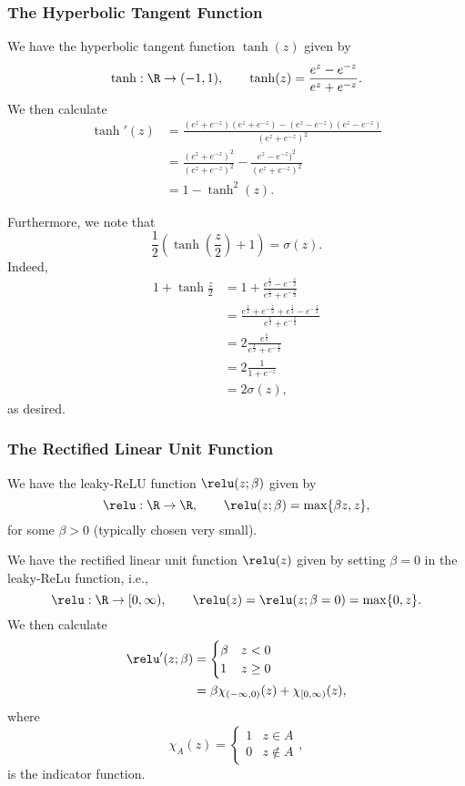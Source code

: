 \subsubsection{The Hyperbolic Tangent Function}
We have the hyperbolic tangent function $\tanh(z)$ given by
$$\tanh:\R\to(-1,1),\qquad\tanh(z)=\frac{e^z-e^{-z}}{e^z+e^{-z}}.$$
We then calculate
\begin{align*}
	\tanh'(z)&=\frac{(e^z+e^{-z})(e^z+e^{-z})-(e^z-e^{-z})(e^z-e^{-z})}{(e^z+e^{-z})^2}\\
	&=\frac{(e^z+e^{-z})^2}{(e^z+e^{-z})^2}-\frac{e^z-e^{-z})^2}{(e^z+e^{-z})^2}\\
	&=1-\tanh^2(z).
\end{align*}

Furthermore, we note that
$$\frac{1}{2}\left(\tanh\left(\frac{z}{2}\right)+1\right)=\sigma(z).$$
Indeed,
\begin{align*}
	1+\tanh{\frac{z}{2}}&=1+\frac{e^{\frac{z}{2}}-e^{-\frac{z}{2}}}{e^{\frac{z}{2}}+e^{-\frac{z}{2}}}\\
	&=\frac{e^{\frac{z}{2}}+e^{-\frac{z}{2}}+e^{\frac{z}{2}}-e^{-\frac{z}{2}}}{e^{\frac{z}{2}}+e^{-\frac{z}{2}}}\\
	&=2\frac{e^{\frac{z}{2}}}{e^{\frac{z}{2}}+e^{-\frac{z}{2}}}\\
	&=2\frac{1}{1+e^{-z}}\\
	&=2\sigma(z),
\end{align*}
as desired.


\subsubsection{The Rectified Linear Unit Function}
We have the leaky-ReLU function $\relu(z;\beta)$ given by
$$\relu:\R\to\R,\qquad \relu(z;\beta)=\max\{\beta z, z\},$$
for some $\beta>0$ (typically chosen very small).

We have the rectified linear unit function $\relu(z)$ given by setting $\beta=0$ in the leaky-ReLu function, i.e.,
$$\relu:\R\to[0,\infty),\qquad\relu(z)=\relu(z;\beta=0)=\max\{0,z\}.$$
We then calculate
\begin{align*}
	\relu'(z;\beta)&=\begin{cases}
		\beta&z<0\\
		1&z\geq0
	\end{cases}\\
	&=\beta\chi_{(-\infty,0)}(z)+\chi_{[0,\infty)}(z),
\end{align*}
where
$$\chi_A(z)=\begin{cases}
	1&z\in A\\
	0&z\notin A
\end{cases},$$
is the indicator function.


